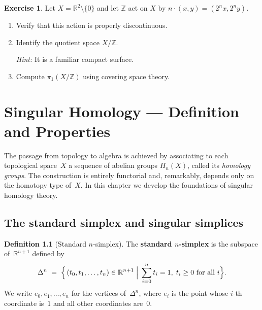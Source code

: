 \documentclass[12pt,a4paper,openany]{book}
\theoremstyle{definition}
\newtheorem{definition}{Definition}[chapter]
\newtheorem{exercise}{Exercise}[chapter]
\theoremstyle{plain}
\theoremstyle{remark}
\newcommand{\Z}{\mathbb{Z}}
\newcommand{\R}{\mathbb{R}}
\begin{document}
\begin{exercise}\label{exo:cov-properly-disc}
  Let $X = \R^2 \setminus \{0\}$ and let $\Z$ act on $X$ by
  $n \cdot (x,y) = (2^n x, 2^n y)$.
  \begin{enumerate}[label=(\alph*)]
    \item Verify that this action is properly discontinuous.
    \item Identify the quotient space $X / \Z$.

      \textit{Hint:} It is a familiar compact surface.
    \item Compute $\pi_1(X/\Z)$ using covering space theory.
  \end{enumerate}
\end{exercise}


\chapter{Singular Homology --- Definition and Properties}\label{ch:singular-homology}

The passage from topology to algebra is achieved by associating to each
topological space~$X$ a sequence of abelian groups $H_n(X)$, called its
\emph{homology groups}.  The construction is entirely
functorial and, remarkably, depends only on the homotopy type of~$X$.
In this chapter we develop the foundations of singular homology theory.

\section{The standard simplex and singular simplices}\label{sec:standard-simplex}

\begin{definition}[Standard $n$-simplex]\label{def:standard-simplex}
The \textbf{standard $n$-simplex} is the subspace of~$\R^{n+1}$ defined by
\[
  \Delta^n \;=\;
  \Bigl\{\,(t_0,t_1,\dots,t_n)\in\R^{n+1}
  \;\Big|\;
  \sum_{i=0}^{n}t_i=1,\; t_i\ge 0 \text{ for all } i
  \Bigr\}.
\]
We write $e_0,e_1,\dots,e_n$ for the vertices of~$\Delta^n$, where
$e_i$ is the point whose $i$-th coordinate is~$1$ and all other
coordinates are~$0$.
\end{definition}
\end{document}
